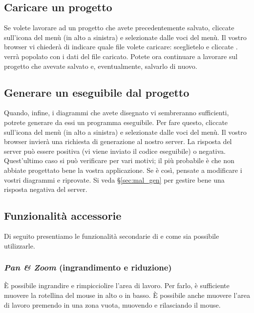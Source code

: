 \subsection{Caricare un progetto} \label{sec:load}

Se volete lavorare ad un progetto che avete precedentemente salvato, cliccate sull'icona del menù (in alto a sinistra) e selezionate  dalle voci del menù. Il vostro browser vi chiederà di indicare quale file volete caricare: sceglietelo e cliccate . \proj{} verrà popolato con i dati del file caricato. Potete ora continuare a lavorare sul progetto che avevate salvato e, eventualmente, salvarlo di nuovo.



\subsection{Generare un eseguibile dal progetto} \label{sec:gen}

Quando, infine, i diagrammi che avete disegnato vi sembreranno sufficienti, potrete generare da essi un programma eseguibile. Per fare questo, cliccate sull'icona del menù (in alto a sinistra) e selezionate  dalle voci del menù. Il vostro browser invierà una richiesta di generazione al nostro server. La risposta del server può essere positiva (vi viene inviato il codice eseguibile) o negativa. Quest'ultimo caso si può verificare per vari motivi; il più probabile è che non abbiate progettato bene la vostra applicazione. Se è così, pensate a modificare i vostri diagrammi e riprovate. Si veda §\ref{sec:mal_gen} per gestire bene una risposta negativa del server.

\subsection{Funzionalità accessorie} \label{sec:extra}
Di seguito presentiamo le funzionalità secondarie di \proj{} e come sia possibile utilizzarle.

\subsubsection{\emph{Pan \& Zoom} (ingrandimento e riduzione)}
È possibile ingrandire e rimpicciolire l'area di lavoro. Per farlo, è sufficiente muovere la rotellina del mouse in alto o in basso. È possibile anche muovere l'area di lavoro premendo in una zona vuota, muovendo e rilasciando il mouse. 

